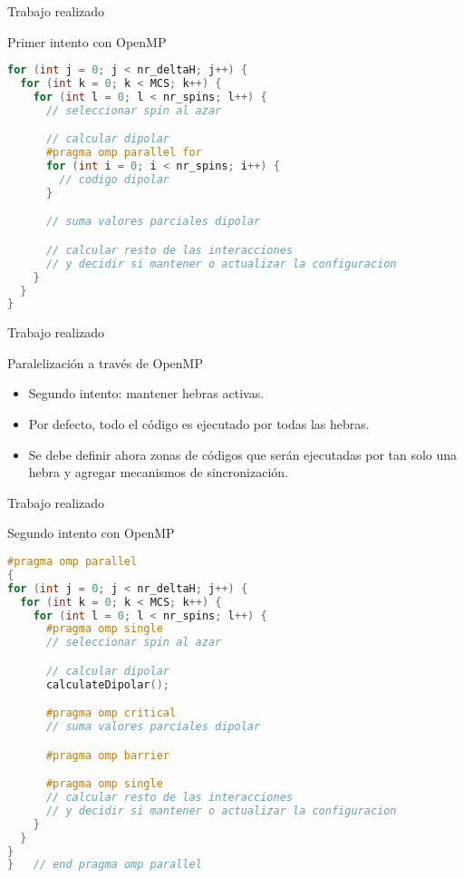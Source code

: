\begin{frame}[fragile]{Trabajo realizado}
\begin{block}{Primer intento con OpenMP}

\begin{lstlisting}[language=C++, basicstyle=\tiny]
for (int j = 0; j < nr_deltaH; j++) {
  for (int k = 0; k < MCS; k++) {
    for (int l = 0; l < nr_spins; l++) {
      // seleccionar spin al azar

      // calcular dipolar
      #pragma omp parallel for
      for (int i = 0; i < nr_spins; i++) {
        // codigo dipolar
      }

      // suma valores parciales dipolar

      // calcular resto de las interacciones
      // y decidir si mantener o actualizar la configuracion
    }
  }
}
\end{lstlisting}

\end{block}
\end{frame}
\begin{frame}{Trabajo realizado}
\begin{block}{Paralelización a través de OpenMP}
\begin{itemize}
  \item Segundo intento: mantener hebras activas.
  \item Por defecto, todo el código es ejecutado por todas las hebras.
  \item Se debe definir ahora zonas de códigos que serán ejecutadas por tan solo una hebra y agregar mecanismos de sincronización.
\end{itemize}
\end{block}
\end{frame}

\begin{frame}[fragile]{Trabajo realizado}
\begin{block}{Segundo intento con OpenMP}

\begin{lstlisting}[language=C++, basicstyle=\tiny]
#pragma omp parallel
{
for (int j = 0; j < nr_deltaH; j++) {
  for (int k = 0; k < MCS; k++) {
    for (int l = 0; l < nr_spins; l++) {
      #pragma omp single
      // seleccionar spin al azar

      // calcular dipolar
      calculateDipolar();

      #pragma omp critical
      // suma valores parciales dipolar

      #pragma omp barrier

      #pragma omp single
      // calcular resto de las interacciones
      // y decidir si mantener o actualizar la configuracion
    }
  }
}
}   // end pragma omp parallel
\end{lstlisting}

\end{block}
\end{frame}

